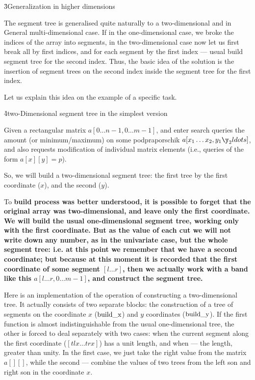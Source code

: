 \h3{Generalization in higher dimensions}

The segment tree is generalised quite naturally to a two-dimensional and in General multi-dimensional case. If in the one-dimensional case, we broke the indices of the array into segments, in the two-dimensional case now let us first break all by first indices, and for each segment by the first index --- usual build segment tree for the second index. Thus, the basic idea of the solution is the insertion of segment trees on the second index inside the segment tree for the first index.

Let us explain this idea on the example of a specific task.

\h4{two-Dimensional segment tree in the simplest version}

Given a rectangular matrix $a[0 \ldots n-1, 0 \ldots m-1]$, and enter search queries the amount (or minimum/maximum) on some podpraporschik $a[x_1 \ldots x_2, y_1 \y_2 ldots]$, and also requests modification of individual matrix elements (i.e., queries of the form $a[x][y] = p$).

So, we will build a two-dimensional segment tree: the first tree by the first coordinate ($x$), and the second ($y$).

To \bf{build process} was better understood, it is possible to forget that the original array was two-dimensional, and leave only the first coordinate. We will build the usual one-dimensional segment tree, working only with the first coordinate. But as the value of each cut we will not write down any number, as in the univariate case, but the whole segment tree: i.e. at this point we remember that we have a second coordinate; but because at this moment it is recorded that the first coordinate of some segment $[l \ldots r]$, then we actually work with a band like this $a[l \ldots r, 0 \ldots m-1]$, and construct the segment tree.

Here is an implementation of the operation of constructing a two-dimensional tree. It actually consists of two separate blocks: the construction of a tree of segments on the coordinate $x$ ($\rm build\_x$) and $y$ coordinates ($\rm build\_y$). If the first function is almost indistinguishable from the usual one-dimensional tree, the other is forced to deal separately with two cases: when the current segment along the first coordinate ($[tlx \ldots trx]$) has a unit length, and when --- the length, greater than unity. In the first case, we just take the right value from the matrix $a[][]$, while the second --- combine the values of two trees from the left son and right son in the coordinate $x$.


